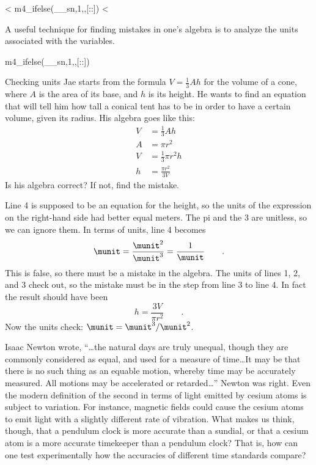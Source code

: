 <%
m4_ifelse(__sn,1,,[:\vfill:])
<%

A useful technique for finding mistakes in one's algebra is to analyze
the units associated with the variables.

m4_ifelse(__sn,1,,[:\pagebreak[4]:])

\begin{eg}{Checking units}\label{eg:checking-units}
\egquestion
Jae starts from the formula $V=\frac{1}{3}Ah$ for the volume of a
cone, where $A$ is the area of its base, and $h$ is its height.
He wants to find an equation that will tell him how tall a conical
tent has to be in order to have a certain volume, given its radius.
His algebra goes like this:
\begin{align}
  V &= \frac{1}{3}Ah \\
  A &= \pi r^2 \\
  V &= \frac{1}{3}\pi r^2 h\\
  h &= \frac{\pi r^2}{3V}
\end{align}
Is his algebra correct? If not, find the mistake.

\eganswer
Line 4 is supposed to be an equation for the height, so the units of the
expression on the right-hand side had better equal meters.
The pi and the 3 are unitless, so we can ignore them.
In terms of units, line 4 becomes
\begin{equation*}
  \munit = \frac{\munit^2}{\munit^3} = \frac{1}{\munit} \qquad .
\end{equation*}
This is false, so there must be a mistake in the algebra. The units
of lines 1, 2, and 3 check out, so the mistake must be in the step
from line 3 to line 4. In fact the result should have been
\begin{equation*}
  h = \frac{3V}{\pi r^2} \qquad .
\end{equation*}
Now the units check: $\munit = \munit^3/\munit^2$.
\end{eg}

\startdq

\begin{dq}
Isaac Newton wrote,
``\ldots the natural days are truly unequal, though they are
commonly considered as equal, and used for a measure of
time\ldots It may be that there is no such thing as an equable
motion, whereby time may be accurately measured. All motions
may be accelerated or retarded\ldots'' Newton was right. Even
the modern definition of the second in terms of light
emitted by cesium atoms is subject to variation. For
instance, magnetic fields could cause the cesium atoms to
emit light with a slightly different rate of vibration. What
makes us think, though, that a pendulum clock is more
accurate than a sundial, or that a cesium atom is a more
accurate timekeeper than a pendulum clock? That is, how can
one test experimentally how the accuracies of different
time standards compare?
\end{dq}

